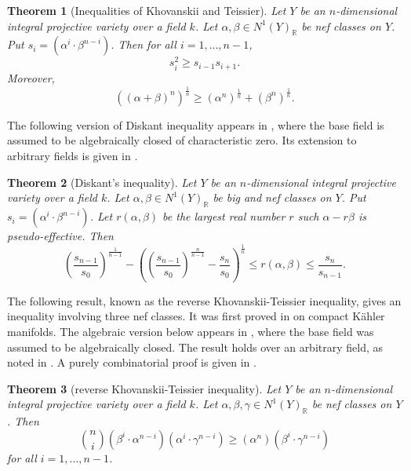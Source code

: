 \documentclass[12pt,a4paper]{amsart}
\theoremstyle{plain}
\newtheorem{theorem}{Theorem}[section]
\theoremstyle{definition}
\numberwithin{equation}{theorem}
\begin{document}
\begin{theorem}[Inequalities of Khovanskii and Teissier]\label{Khovanskii-Teissier}
Let $Y$ be an $n$-dimensional integral projective variety over a field $k$. Let $\alpha, \beta \in {N^1\left(Y\right)}_{\mathbb{R}}$ be nef classes on $Y$. Put $s_i = \left(\alpha^i\cdot \beta^{n-i}\right)$. Then for all $i=1,\ldots,n-1$,
\begin{equation}\label{ineq1}
 s_i^2 \geq s_{i-1}s_{i+1}.
\end{equation}
Moreover,
\begin{equation}\label{ineq3}
 {\left(\left(\alpha + \beta\right)^{n}\right)}^{\tfrac{1}{n}} \geq {\left(\alpha^{n}\right)}^{\tfrac{1}{n}} + {\left(\beta^{n}\right)}^{\tfrac{1}{n}}.
\end{equation}
\end{theorem}

The following version of Diskant inequality appears in \cite[Theorem F]{BFJ09}, where the base field is assumed to be algebraically closed of characteristic zero. Its extension to arbitrary fields is given in \cite{Cut15}.

\begin{theorem}[Diskant's inequality]\label{diskant}
Let $Y$ be an $n$-dimensional integral projective variety over a field $k$. Let $\alpha, \beta \in {N^1\left(Y\right)}_{\mathbb{R}}$ be big and nef classes on $Y$. Put $s_i = \left(\alpha^i\cdot \beta^{n-i}\right)$. Let $r(\alpha,\beta)$ be the largest real number $r$ such $\alpha - r\beta$ is pseudo-effective. Then $$\left(\frac{s_{n-1}}{s_0}\right)^{\tfrac{1}{n-1}} - \left(\left(\frac{s_{n-1}}{s_0}\right)^{\tfrac{n}{n-1}} - \frac{s_{n}}{s_0}\right)^{\tfrac{1}{n}} \leq r(\alpha,\beta) \leq \frac{s_n}{s_{n-1}}.$$
\end{theorem}

The following result, known as the reverse Khovanskii-Teissier inequality, gives an inequality involving three nef classes. It was first proved in \cite{LX17} on compact K\"{a}hler manifolds. The algebraic version below appears in \cite[Theorem 1.1]{JL23}, where the base field was assumed to be algebraically closed. The result holds over an arbitrary field, as noted in \cite[Remark 1.14]{GHMSW25}. A purely combinatorial proof is given in \cite{HX24}.

\begin{theorem}[reverse Khovanskii-Teissier inequality]\label{reverse}
Let $Y$ be an $n$-dimensional integral projective variety over a field $k$. Let $\alpha, \beta, \gamma \in {N^1\left(Y\right)}_{\mathbb{R}}$ be nef classes on $Y$. Then
$$\binom{n}{i} \left(\beta^i\cdot \alpha^{n-i}\right) \left(\alpha^i\cdot \gamma^{n-i}\right) \geq \left(\alpha^n\right) \left(\beta^i\cdot \gamma^{n-i}\right)$$ for all $i=1,\ldots,n-1$.
\end{theorem}
\end{document}
